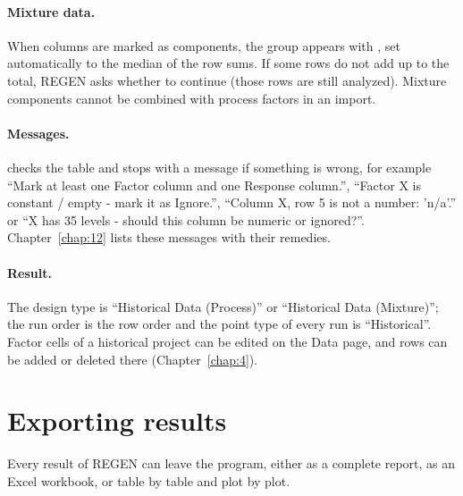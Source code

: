 \paragraph{Mixture data.} When columns are marked as components, the group  appears with
, set automatically to the median of the row sums. If some rows do not add up to the total, REGEN
asks whether to continue (those rows are still analyzed). Mixture components cannot be combined with process
factors in an import.

\paragraph{Messages.}  checks the table and stops with a message if something is wrong, for
example ``Mark at least one Factor column and one Response column.'', ``Factor X is constant / empty - mark it as
Ignore.'', ``Column X, row 5 is not a number: 'n/a'.'' or ``X has 35 levels - should this column be numeric or
ignored?''. Chapter~\ref{chap:12} lists these messages with their remedies.

\paragraph{Result.} The design type is ``Historical Data (Process)'' or ``Historical Data (Mixture)''; the run
order is the row order and the point type of every run is ``Historical''. Factor cells of a historical project can
be edited on the Data page, and rows can be added or deleted there (Chapter~\ref{chap:4}).

\section{Exporting results}
\label{sec:ch02-export}

Every result of REGEN can leave the program, either as a complete report, as an Excel workbook, or table by table
and plot by plot.

